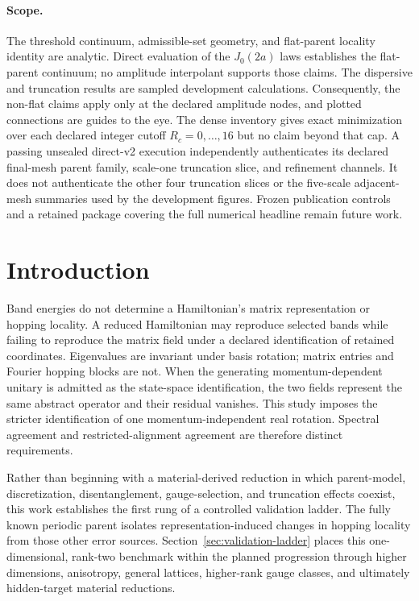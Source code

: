 \documentclass[aps,prb,reprint,amsmath,amssymb,longbibliography,floatfix]{revtex4-2}
\begin{document}
\paragraph{Scope.}
The threshold continuum, admissible-set geometry, and flat-parent locality identity are
analytic. Direct evaluation of the $J_0(2a)$ laws establishes the flat-parent continuum;
no amplitude interpolant supports those claims. The dispersive and truncation results
are sampled development calculations. Consequently, the non-flat claims apply only at
the declared amplitude nodes, and plotted connections are guides to the eye. The dense
inventory gives exact minimization over each declared integer cutoff
$R_c=0,\ldots,16$ but no claim beyond that cap. A passing unsealed direct-v2
execution independently authenticates its declared final-mesh parent family,
scale-one truncation slice, and refinement channels. It does not authenticate the
other four truncation slices or the five-scale adjacent-mesh summaries used by the
development figures. Frozen publication controls and a retained package covering the
full numerical headline remain future work.

\section{Introduction}

Band energies do not determine a Hamiltonian's matrix representation or hopping
locality. A reduced Hamiltonian may reproduce selected bands while failing to reproduce
the matrix field under a declared identification of retained coordinates. Eigenvalues
are invariant under basis rotation; matrix entries and Fourier hopping blocks are not.
When the generating momentum-dependent unitary is admitted as the state-space
identification, the two fields represent the same abstract operator and their residual
vanishes. This study imposes the stricter identification of one momentum-independent
real rotation. Spectral agreement and restricted-alignment agreement are therefore
distinct requirements.

Rather than beginning with a material-derived reduction in which parent-model,
discretization, disentanglement, gauge-selection, and truncation effects coexist, this
work establishes the first rung of a controlled validation ladder. The fully known
periodic parent isolates representation-induced changes in hopping locality from those
other error sources. Section~\ref{sec:validation-ladder} places this one-dimensional,
rank-two benchmark within the planned progression through higher dimensions,
anisotropy, general lattices, higher-rank gauge classes, and ultimately hidden-target
material reductions.
\end{document}
